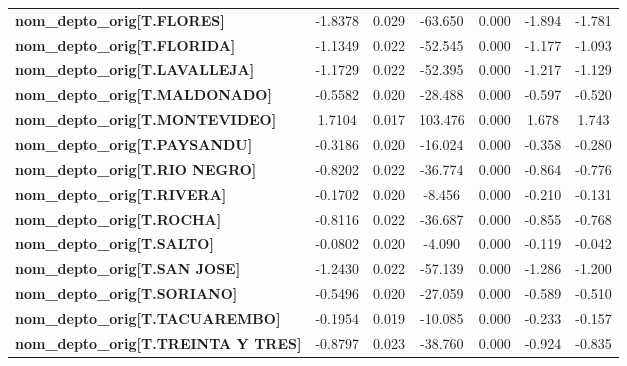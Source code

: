 \begin{center}
\begin{tabular}{lcccccc}
\textbf{nom\_depto\_orig[T.FLORES]}         &      -1.8378  &        0.029     &   -63.650  &         0.000        &       -1.894    &       -1.781     \\
\textbf{nom\_depto\_orig[T.FLORIDA]}        &      -1.1349  &        0.022     &   -52.545  &         0.000        &       -1.177    &       -1.093     \\
\textbf{nom\_depto\_orig[T.LAVALLEJA]}      &      -1.1729  &        0.022     &   -52.395  &         0.000        &       -1.217    &       -1.129     \\
\textbf{nom\_depto\_orig[T.MALDONADO]}      &      -0.5582  &        0.020     &   -28.488  &         0.000        &       -0.597    &       -0.520     \\
\textbf{nom\_depto\_orig[T.MONTEVIDEO]}     &       1.7104  &        0.017     &   103.476  &         0.000        &        1.678    &        1.743     \\
\textbf{nom\_depto\_orig[T.PAYSANDU]}       &      -0.3186  &        0.020     &   -16.024  &         0.000        &       -0.358    &       -0.280     \\
\textbf{nom\_depto\_orig[T.RIO NEGRO]}      &      -0.8202  &        0.022     &   -36.774  &         0.000        &       -0.864    &       -0.776     \\
\textbf{nom\_depto\_orig[T.RIVERA]}         &      -0.1702  &        0.020     &    -8.456  &         0.000        &       -0.210    &       -0.131     \\
\textbf{nom\_depto\_orig[T.ROCHA]}          &      -0.8116  &        0.022     &   -36.687  &         0.000        &       -0.855    &       -0.768     \\
\textbf{nom\_depto\_orig[T.SALTO]}          &      -0.0802  &        0.020     &    -4.090  &         0.000        &       -0.119    &       -0.042     \\
\textbf{nom\_depto\_orig[T.SAN JOSE]}       &      -1.2430  &        0.022     &   -57.139  &         0.000        &       -1.286    &       -1.200     \\
\textbf{nom\_depto\_orig[T.SORIANO]}        &      -0.5496  &        0.020     &   -27.059  &         0.000        &       -0.589    &       -0.510     \\
\textbf{nom\_depto\_orig[T.TACUAREMBO]}     &      -0.1954  &        0.019     &   -10.085  &         0.000        &       -0.233    &       -0.157     \\
\textbf{nom\_depto\_orig[T.TREINTA Y TRES]} &      -0.8797  &        0.023     &   -38.760  &         0.000        &       -0.924    &       -0.835     \\

\end{tabular}
\end{center}
